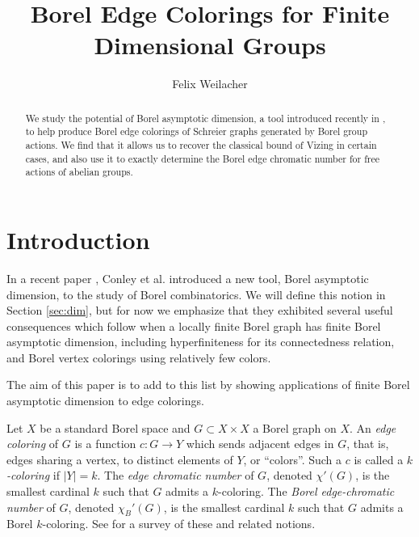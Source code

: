 \documentclass[12pt]{article}
\newcommand{\0}{\varnothing}
\begin{document}
 
\title{Borel Edge Colorings for Finite Dimensional Groups}
\author{Felix Weilacher}
\maketitle

\begin{abstract}
\noindent We study the potential of Borel asymptotic dimension, a tool introduced recently in \cite{dim}, to help produce Borel edge colorings of Schreier graphs generated by Borel group actions. We find that it allows us to recover the classical bound of Vizing in certain cases, and also use it to exactly determine the Borel edge chromatic number for free actions of abelian groups. 
\end{abstract}


\section{Introduction}\label{sec:intro}


In a recent paper \cite{dim}, Conley et al. introduced a new tool, Borel asymptotic dimension, to the study of Borel combinatorics. We will define this notion in Section \ref{sec:dim}, but for now we emphasize that they exhibited several useful consequences which follow when a locally finite Borel graph has finite Borel asymptotic dimension, including hyperfiniteness for its connectedness relation, and Borel vertex colorings using relatively few colors. 

The aim of this paper is to add to this list by showing applications of finite Borel asymptotic dimension to edge colorings.

Let $X$ be a standard Borel space and $G \subset X \times X$ a Borel graph on $X$. An \textit{edge coloring} of $G$ is a function $c:G \rightarrow Y$ which sends adjacent edges in $G$, that is, edges sharing a vertex, to distinct elements of $Y$, or ``colors''. Such a $c$ is called a \textit{$k$-coloring} if $|Y| = k$. The \textit{edge chromatic number} of $G$, denoted $\chi'(G)$, is the smallest cardinal $k$ such that $G$ admits a $k$-coloring. The \textit{Borel edge-chromatic number} of $G$, denoted $\chi_B'(G)$, is the smallest cardinal $k$ such that $G$ admits a Borel $k$-coloring. See \cite{KM} for a survey of these and related notions.
\end{document}
